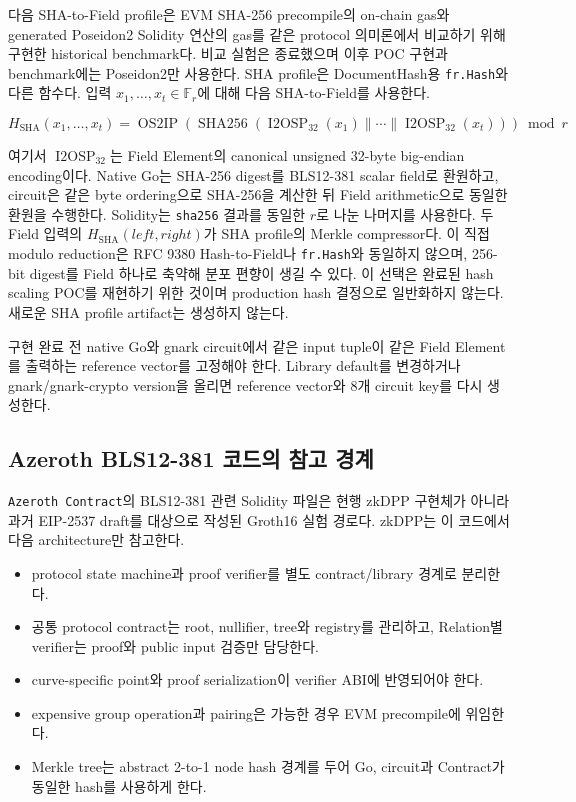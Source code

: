 \documentclass[11pt,a4paper]{extarticle}
\begin{document}
다음 SHA-to-Field profile은 EVM SHA-256 precompile의 on-chain gas와 generated
Poseidon2 Solidity 연산의 gas를 같은 protocol 의미론에서 비교하기 위해 구현한 historical
benchmark다. 비교 실험은 종료했으며 이후 POC 구현과 benchmark에는 Poseidon2만 사용한다.
SHA profile은
DocumentHash용 \texttt{fr.Hash}와 다른 함수다. 입력
$x_1,\ldots,x_t\in\mathbb{F}_r$에 대해 다음 SHA-to-Field를 사용한다.

\[
H_{\mathrm{SHA}}(x_1,\ldots,x_t)=
\operatorname{OS2IP}\!\left(
\operatorname{SHA256}(\operatorname{I2OSP}_{32}(x_1)\|\cdots\|\operatorname{I2OSP}_{32}(x_t))
\right)\bmod r
\]

여기서 $\operatorname{I2OSP}_{32}$는 Field Element의 canonical unsigned 32-byte
big-endian encoding이다. Native Go는 SHA-256 digest를 BLS12-381 scalar field로
환원하고, circuit은 같은 byte ordering으로 SHA-256을 계산한 뒤 Field arithmetic으로
동일한 환원을 수행한다. Solidity는 \texttt{sha256} 결과를 동일한 $r$로 나눈 나머지를
사용한다. 두 Field 입력의 $H_{\mathrm{SHA}}(left,right)$가 SHA profile의 Merkle
compressor다. 이 직접 modulo reduction은 RFC 9380 Hash-to-Field나 \texttt{fr.Hash}와
동일하지 않으며, 256-bit digest를 Field 하나로 축약해 분포 편향이 생길 수 있다.
이 선택은 완료된 hash scaling POC를 재현하기 위한 것이며 production hash 결정으로
일반화하지 않는다. 새로운 SHA profile artifact는 생성하지 않는다.

구현 완료 전 native Go와 gnark circuit에서 같은 input tuple이 같은 Field Element를
출력하는 reference vector를 고정해야 한다. Library default를 변경하거나
gnark/gnark-crypto version을 올리면 reference vector와 8개 circuit key를 다시 생성한다.

\subsection{Azeroth BLS12-381 코드의 참고 경계}

\texttt{Azeroth Contract}의 BLS12-381 관련 Solidity 파일은 현행 zkDPP 구현체가 아니라
과거 EIP-2537 draft를 대상으로 작성된 Groth16 실험 경로다. zkDPP는 이 코드에서
다음 architecture만 참고한다.

\begin{itemize}
  \item protocol state machine과 proof verifier를 별도 contract/library 경계로 분리한다.
  \item 공통 protocol contract는 root, nullifier, tree와 registry를 관리하고,
        Relation별 verifier는 proof와 public input 검증만 담당한다.
  \item curve-specific point와 proof serialization이 verifier ABI에 반영되어야 한다.
  \item expensive group operation과 pairing은 가능한 경우 EVM precompile에 위임한다.
  \item Merkle tree는 abstract 2-to-1 node hash 경계를 두어 Go, circuit과 Contract가
        동일한 hash를 사용하게 한다.
\end{itemize}
\end{document}

